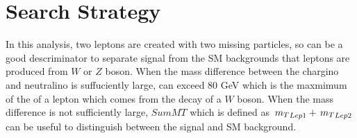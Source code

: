 \section{Search Strategy}
\label{sect:search}
In this analysis, two leptons are created with two missing particles, so \mttwo can be a good descriminator to separate signal 
from the SM backgrounds that leptons are produced from $W$ or $Z$ boson. When the mass difference between the chargino and neutralino 
is suffuciently large, \mttwo can exceed 80 GeV which is the maxmimum of the \mt of a lepton which comes from the decay of a $W$ boson.
When the mass difference is not sufficiently large, $SumMT$ which is defined as $\,{m_T}_{Lep1} + \,{m_T}_{Lep2}$ can be useful to distinguish between the 
signal and SM background. 


